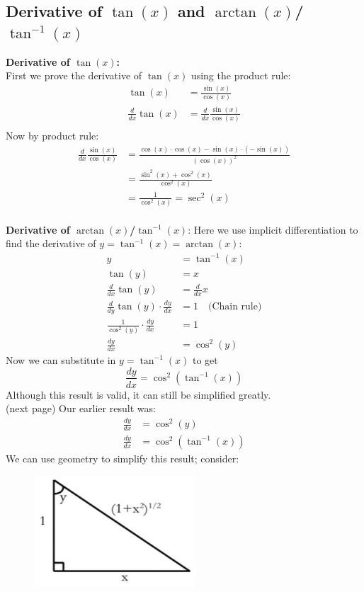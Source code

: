 \documentclass{report}
\begin{document}
\subsection{Derivative of $\tan(x)$ and $\arctan(x)$/$\tan^{-1}(x)$} %
\textbf{Derivative of $\tan(x)$:}\\
First we prove the derivative of $\tan(x)$ using the product rule:
\begin{align*}
\tan(x)&=\frac{\sin(x)}{\cos(x)}\\
\frac{d}{dx}\tan(x)&=\frac{d}{dx}\frac{\sin(x)}{\cos(x)}\\
\end{align*}
Now by product rule:
\begin{align*}
\frac{d}{dx}\frac{\sin(x)}{\cos(x)}&=\frac{\cos(x)\cdot\cos(x)
-\sin(x)\cdot(-\sin(x))}{(\cos(x))^{2}}\\
&=\frac{\sin^2(x)+\cos^2(x)}{\cos^2(x)}\\
&=\frac{1}{\cos^2(x)}=\sec^2(x)
\end{align*}
\vspace{2mm}\\
\textbf{Derivative of $\arctan(x)$/$\tan^{-1}(x)$}:
Here we use implicit differentiation to find the derivative of $y=\tan^{-1}(x)=\arctan(x)$:
\begin{align*}
y&=\tan^{-1}(x)\\
\tan(y)&=x\\
\frac{d}{dx}\tan(y)&=\frac{d}{dx}x\\
\frac{d}{dy}\tan(y)\cdot\frac{dy}{dx}&=1\quad\text{(Chain rule)}\\
\frac{1}{\cos^2(y)}\cdot\frac{dy}{dx}&=1\\
\frac{dy}{dx}&=\cos^2(y)
\end{align*}
Now we can substitute in $y=\tan^{-1}(x)$ to get
\begin{equation*}
\frac{dy}{dx}=\cos^2(\tan^{-1}(x))
\end{equation*}
Although this result is valid, it can still be simplified greatly.\\
(next page)
\newpage
\noindent Our earlier result was:
\begin{align*}
\frac{dy}{dx}&=\cos^2(y)\\
\frac{dy}{dx}&=\cos^2(\tan^{-1}(x))
\end{align*}
We can use geometry to simplify this result; consider:
\begin{figure}[h]
\includegraphics[width=6cm]{Capture15}\\
\centering
{}
\end{figure}\\
\end{document}
